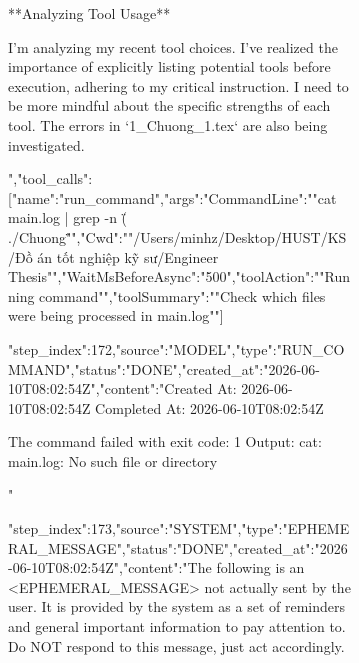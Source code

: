 \begin{figure}[htbp]
{{\begin{figure}[H]
{**Analyzing Tool Usage**

I'm analyzing my recent tool choices. I've realized the importance of explicitly listing potential tools before execution, adhering to my critical instruction. I need to be more mindful about the specific strengths of each tool. The errors in `1_Chuong_1.tex` are also being investigated.


","tool_calls":[{"name":"run_command","args":{"CommandLine":""cat main.log | grep -n \"(\\./Chuong\""","Cwd":""/Users/minhz/Desktop/HUST/KS/Đồ án tốt nghiệp kỹ sư/Engineer Thesis"","WaitMsBeforeAsync":"500","toolAction":""Running command"","toolSummary":""Check which files were being processed in main.log""}}]}
{"step_index":172,"source":"MODEL","type":"RUN_COMMAND","status":"DONE","created_at":"2026-06-10T08:02:54Z","content":"Created At: 2026-06-10T08:02:54Z
Completed At: 2026-06-10T08:02:54Z

				The command failed with exit code: 1
				Output:
				cat: main.log: No such file or directory

"}
{"step_index":173,"source":"SYSTEM","type":"EPHEMERAL_MESSAGE","status":"DONE","created_at":"2026-06-10T08:02:54Z","content":"The following is an <EPHEMERAL_MESSAGE> not actually sent by the user. It is provided by the system as a set of reminders and general important information to pay attention to. Do NOT respond to this message, just act accordingly.

}
\end{figure}}}
\end{figure}
